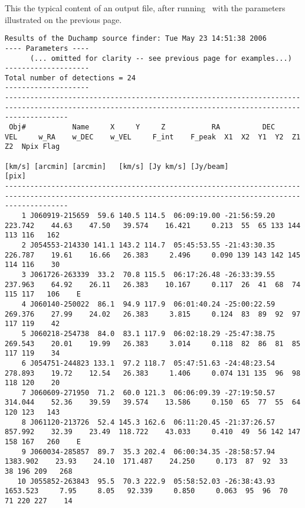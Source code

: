 \label{app-output}
This the typical content of an output file, after running \duchamp\
with the parameters illustrated on the previous page. 

{\scriptsize 
  \begin{verbatim}
Results of the Duchamp source finder: Tue May 23 14:51:38 2006
---- Parameters ----
      (... omitted for clarity -- see previous page for examples...)
--------------------
Total number of detections = 24
--------------------
-----------------------------------------------------------------------------------------------------------------------------------------------------------
 Obj#           Name     X     Y     Z           RA          DEC      VEL     w_RA    w_DEC    w_VEL     F_int    F_peak  X1  X2  Y1  Y2  Z1  Z2  Npix Flag
                                                                   [km/s] [arcmin] [arcmin]   [km/s] [Jy km/s] [Jy/beam]                         [pix]     
-----------------------------------------------------------------------------------------------------------------------------------------------------------
    1 J060919-215659  59.6 140.5 114.5  06:09:19.00 -21:56:59.20  223.742    44.63    47.50   39.574    16.421     0.213  55  65 133 144 113 116   162     
    2 J054553-214330 141.1 143.2 114.7  05:45:53.55 -21:43:30.35  226.787    19.61    16.66   26.383     2.496     0.090 139 143 142 145 114 116    30     
    3 J061726-263339  33.2  70.8 115.5  06:17:26.48 -26:33:39.55  237.963    64.92    26.11   26.383    10.167     0.117  26  41  68  74 115 117   106    E
    4 J060140-250022  86.1  94.9 117.9  06:01:40.24 -25:00:22.59  269.376    27.99    24.02   26.383     3.815     0.124  83  89  92  97 117 119    42     
    5 J060218-254738  84.0  83.1 117.9  06:02:18.29 -25:47:38.75  269.543    20.01    19.99   26.383     3.014     0.118  82  86  81  85 117 119    34     
    6 J054751-244823 133.1  97.2 118.7  05:47:51.63 -24:48:23.54  278.893    19.72    12.54   26.383     1.406     0.074 131 135  96  98 118 120    20     
    7 J060609-271950  71.2  60.0 121.3  06:06:09.39 -27:19:50.57  314.044    52.36    39.59   39.574    13.586     0.150  65  77  55  64 120 123   143     
    8 J061120-213726  52.4 145.3 162.6  06:11:20.45 -21:37:26.57  857.992    32.39    23.49  118.722    43.033     0.410  49  56 142 147 158 167   260    E
    9 J060034-285857  89.7  35.3 202.4  06:00:34.35 -28:58:57.94 1383.902    23.93    24.10  171.487    24.250     0.173  87  92  33  38 196 209   268     
   10 J055852-263843  95.5  70.3 222.9  05:58:52.03 -26:38:43.93 1653.523     7.95     8.05   92.339     0.850     0.063  95  96  70  71 220 227    14     

\end{verbatim}}
